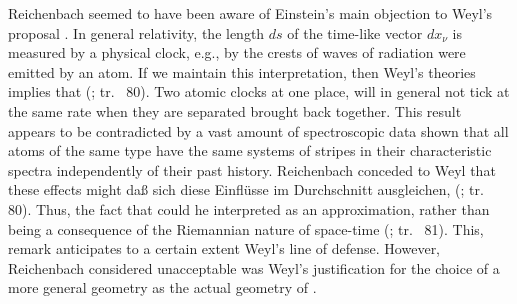 \documentclass[draft]{article}
\newcommand{\rhp}[2]{(\cite[#1]{Reichenbach1920a}; tr.\ \citeyear{Reichenbach1969} #2)\xspace}
\begin{document}
Reichenbach seemed to have been aware of Einstein's main objection to Weyl's proposal \citep[see]{Einstein1918b}. In general relativity, the length $ds$ of the time-like vector $dx_\nu$ is measured by a physical clock, e.g., by the crests of waves of radiation were emitted by an atom. If we maintain this interpretation, then Weyl's theories implies that  \rhp{77}{80}. Two atomic clocks at one place, will in general not tick at the same rate when they are separated brought back together. This result appears to be contradicted by a vast amount of spectroscopic data shown that all atoms of the same type have the same systems of stripes in their characteristic spectra independently of their past history. Reichenbach conceded to Weyl that these effects might daß sich diese Einflüsse im Durchschnitt ausgleichen, \rhp{77}{80}. Thus, the fact that  could he interpreted as an approximation, rather than being a consequence of the Riemannian nature of space-time \rhp{77}{81}. This, remark anticipates to a certain extent Weyl's line of defense. However, Reichenbach considered unacceptable was Weyl's justification for the choice of a more general geometry as the actual geometry of \spti.
\end{document}
